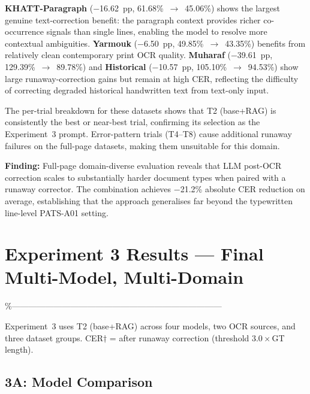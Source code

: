 \textbf{KHATT-Paragraph} ($-$16.62~pp, 61.68\%~$\to$~45.06\%) shows the
largest genuine text-correction benefit: the paragraph context provides
richer co-occurrence signals than single lines, enabling the model to resolve
more contextual ambiguities. \textbf{Yarmouk} ($-$6.50~pp, 49.85\%~$\to$~43.35\%)
benefits from relatively clean contemporary print OCR quality. \textbf{Muharaf}
($-$39.61~pp, 129.39\%~$\to$~89.78\%) and \textbf{Historical}
($-$10.57~pp, 105.10\%~$\to$~94.53\%) show large runaway-correction gains but
remain at high CER, reflecting the difficulty of correcting degraded
historical handwritten text from text-only input.

The per-trial breakdown for these datasets shows that T2 (base+RAG) is
consistently the best or near-best trial, confirming its selection as the
Experiment~3 prompt. Error-pattern trials (T4--T8) cause additional runaway
failures on the full-page datasets, making them unsuitable for this domain.

\textbf{Finding:} Full-page domain-diverse evaluation reveals that LLM
post-OCR correction scales to substantially harder document types when paired
with a runaway corrector. The combination achieves $-$21.2\% absolute CER
reduction on average, establishing that the approach generalises far beyond
the typewritten line-level PATS-A01 setting.

\section{Experiment 3 Results --- Final Multi-Model, Multi-Domain}
\label{sec:res_exp3}
\%---------------------------------------------------------------------------

Experiment~3 uses T2 (base+RAG) across four models, two OCR sources,
and three dataset groups. CER$\dagger$ = after runaway correction
(threshold $3.0{\times}$GT length).

\subsection{3A: Model Comparison}
\label{subsec:res_exp3_models}

